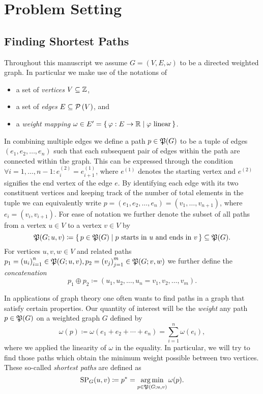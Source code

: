 \chapter{Problem Setting}

\section{Finding Shortest Paths}

Throughout this manuscript we assume $G = (V, E, \omega)$ to be a directed weighted graph.
In particular we make use of the notations of
\begin{itemize}
    \item a set of \emph{vertices} $V \subseteq \mathbb{Z}$,
    \item a set of \emph{edges} $E \subseteq \mathcal{P}\left(V\right)$, and
    \item a \emph{weight mapping} $\omega \in E' = \left\{\,\varphi: E \rightarrow \mathbb{R}\mid\text{$\varphi$ linear}\,\right\}$.
\end{itemize}
In combining multiple edges we define a path $p \in \mathfrak{P}(G)$ to be a tuple of edges $(e_1, e_2, \dots, e_n)$ such that each subsequent pair of edges within the path are connected within the graph.
This can be expressed through the condition $\forall i = 1, \dots, n - 1: e_i^{(2)} = e_{i + 1}^{(1)}$, where $e^{(1)}$ denotes the starting vertex and $e^{(2)}$ signifies the end vertex of the edge $e$.
By identifying each edge with its two constituent vertices and keeping track of the number of total elements in the tuple we can equivalently write $p = (e_1, e_2, \dots, e_n) = (v_1, \dots, v_{n + 1})$, where $e_i = (v_i, v_{i + 1})$.
For ease of notation we further denote the subset of all paths from a vertex $u \in V$ to a vertex $v \in V$ by
\[
    \mathfrak{P}(G; u, v) \coloneqq \left\{\,p \in \mathfrak{P}(G)\mid\text{$p$ starts in $u$ and ends in $v$}\,\right\} \subseteq \mathfrak{P}(G).
\]
For vertices $u, v, w \in V$ and related paths $p_1 = {(u_i)}_{i = 1}^n \in \mathfrak{P}(G; u, v), p_2 = {(v_j)}_{j = 1}^m \in \mathfrak{P}(G; v, w)$ we further define the \emph{concatenation}
\[
    p_1 \oplus p_2 \coloneqq (u_1, u_2, \dots, u_n = v_1, v_2, \dots, v_m).
\]

In applications of graph theory one often wants to find paths in a graph that satisfy certain properties.
Our quantity of interest will be the \emph{weight} any path $p \in \mathfrak{P}(G)$ on a weighted graph $G$ defined by
\[
    \omega(p) \coloneqq \omega\left( e_1 + e_2 + \cdots + e_n \right) = \sum\limits_{i = 1}^n \omega(e_i),
\]
where we applied the linearity of $\omega$ in the equality.
In particular, we will try to find those paths which obtain the minimum weight possible between two vertices.
These so-called \emph{shortest paths} are defined as
\[
    \operatorname{SP}_G(u, v) \coloneqq p^* = \operatorname*{arg\,min}\limits_{p \in \mathfrak{P}(G; u, v)} \omega(p).
\]

